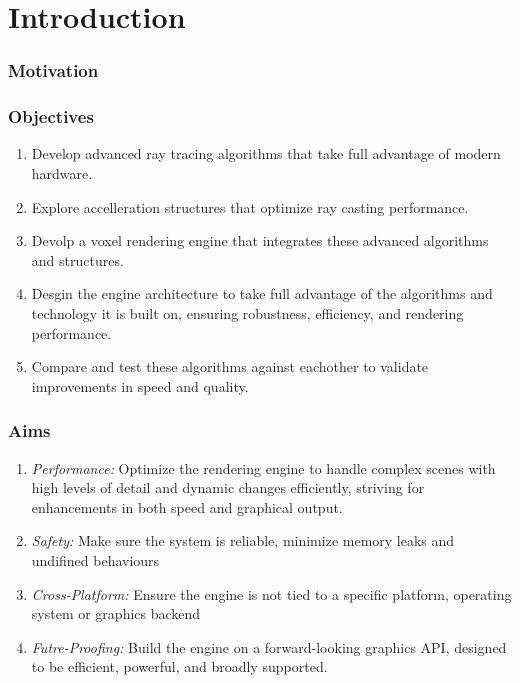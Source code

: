 
\part{Introduction}\label{intro}
\section{Motivation}



\section{Objectives}
\label{obj}
\begin{enumerate}
  \item Develop advanced ray tracing algorithms that take full advantage of modern hardware.
  \item Explore accelleration structures that optimize ray casting performance.
  \item Devolp a voxel rendering engine that integrates these advanced algorithms and structures.
  \item Desgin the engine architecture to take full advantage of the algorithms and technology it is built on, ensuring robustness, efficiency, and rendering performance.
  \item Compare and test these algorithms against eachother to validate improvements in speed and quality.
\end{enumerate}

\section{Aims}
\label{aims}
\begin{enumerate}
  \item \emph{Performance:} Optimize the rendering engine to handle complex scenes with high levels of detail and dynamic changes efficiently, striving for enhancements in both speed and graphical output.
  \item \emph{Safety:} Make sure the system is reliable, minimize memory leaks and undifined behaviours
  \item \emph{Cross-Platform:} Ensure the engine is not tied to a specific platform, operating system or graphics backend
  \item \emph{Futre-Proofing:} Build the engine on a forward-looking graphics API, designed to be efficient, powerful, and broadly supported.
\end{enumerate}

